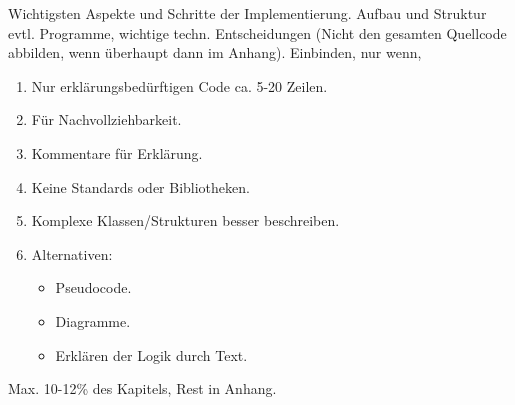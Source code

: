 \begin{tcolorbox}[
	enhanced,
	colback=red!5!white,
	colframe=red!75!black!50,
	title= Mein roter Faden
	]
	Wichtigsten Aspekte und Schritte der Implementierung. Aufbau und Struktur evtl. Programme, wichtige techn. Entscheidungen (Nicht den gesamten Quellcode abbilden, wenn überhaupt dann im Anhang). Einbinden, nur wenn,

	\begin{enumerate}
		\item Nur erklärungsbedürftigen Code ca. 5-20 Zeilen.
		\item Für Nachvollziehbarkeit.
		\item Kommentare für Erklärung.
		\item Keine Standards oder Bibliotheken.
		\item Komplexe Klassen/Strukturen besser beschreiben.
		\item Alternativen:
		\begin{itemize}
			\item Pseudocode.
			\item Diagramme.
			\item Erklären der Logik durch Text.
		\end{itemize}
	\end{enumerate}

	Max. 10-12\% des Kapitels, Rest in Anhang.
\end{tcolorbox}

